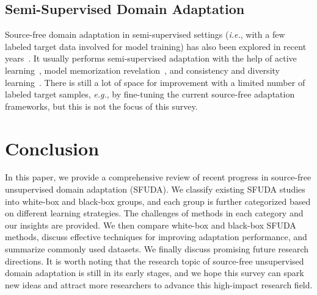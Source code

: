 \documentclass[10pt,journal,compsoc]{IEEEtran}
\def\eg{{\em e.g.}}
\def\ie{{\em i.e.}}
\begin{document}
\subsection{Semi-Supervised Domain Adaptation}
Source-free domain adaptation in semi-supervised settings (\ie, with a few labeled target data involved for model training) has also been explored in recent years~\cite{chidlovskii2016domain, kothandaraman2021ss, nelakurthi2018source}. 
It usually performs semi-supervised adaptation with the help of active learning~\cite{wang2022active, kothandaraman2022distilladapt}, model memorization revelation~\cite{yang2022revealing}, and consistency and diversity learning~\cite{wang2021learning}. 
There is still a lot of space for improvement with a limited number of labeled target samples, \eg, by fine-tuning the current source-free adaptation frameworks, but this is not the focus of this survey.


\section{Conclusion}\label{sec_conclusion}
In this paper, we provide a comprehensive review of recent progress in source-free unsupervised domain adaptation (SFUDA).
We classify existing SFUDA studies into white-box and black-box groups, and each group is further categorized based on different learning strategies.
The challenges of methods in each category and our insights are provided. 
We then compare white-box and black-box SFUDA methods, discuss effective techniques for improving adaptation performance, and summarize commonly used datasets. %
We finally discuss promising future research directions. 
It is worth noting that the research topic of source-free unsupervised domain adaptation is still in its early stages, and we hope this survey can spark new ideas and attract more researchers to advance this high-impact research field.



\end{document}
